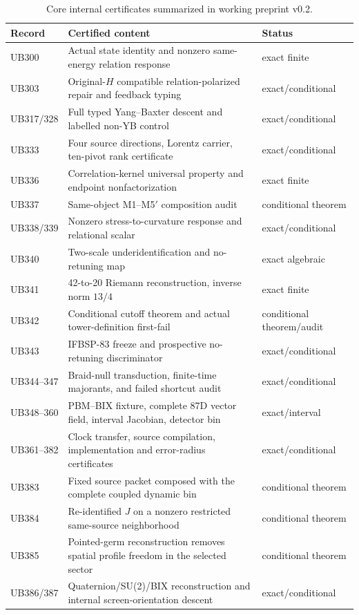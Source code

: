 \documentclass[11pt]{article}
\theoremstyle{definition}
\theoremstyle{remark}
\begin{document}
\begin{table}[ht]
\centering
\small
\caption{Core internal certificates summarized in working preprint v0.2.}
\label{tab:certificates}
\begin{tabularx}{\linewidth}{@{}lXl@{}}
\toprule
Record & Certified content & Status\\
\midrule
UB300 & Actual state identity and nonzero same-energy relation response & exact finite\\
UB303 & Original-$H$ compatible relation-polarized repair and feedback typing & exact/conditional\\
UB317/328 & Full typed Yang--Baxter descent and labelled non-YB control & exact/conditional\\
UB333 & Four source directions, Lorentz carrier, ten-pivot rank certificate & exact/conditional\\
UB336 & Correlation-kernel universal property and endpoint nonfactorization & exact finite\\
UB337 & Same-object M1--M5$'$ composition audit & conditional theorem\\
UB338/339 & Nonzero stress-to-curvature response and relational scalar & exact/conditional\\
UB340 & Two-scale underidentification and no-retuning map & exact algebraic\\
UB341 & 42-to-20 Riemann reconstruction, inverse norm $13/4$ & exact finite\\
UB342 & Conditional cutoff theorem and actual tower-definition first-fail & conditional theorem/audit\\
UB343 & IFBSP-83 freeze and prospective no-retuning discriminator & exact/conditional\\
UB344--347 & Braid-null transduction, finite-time majorants, and failed shortcut audit & exact/conditional\\
UB348--360 & PBM--BIX fixture, complete 87D vector field, interval Jacobian, detector bin & exact/interval\\
UB361--382 & Clock transfer, source compilation, implementation and error-radius certificates & exact/conditional\\
UB383 & Fixed source packet composed with the complete coupled dynamic bin & conditional theorem\\
UB384 & Re-identified $J$ on a nonzero restricted same-source neighborhood & conditional theorem\\
UB385 & Pointed-germ reconstruction removes spatial profile freedom in the selected sector & conditional theorem\\
UB386/387 & Quaternion/SU(2)/BIX reconstruction and internal screen-orientation descent & exact/conditional\\
\bottomrule
\end{tabularx}
\end{table}
\end{document}
